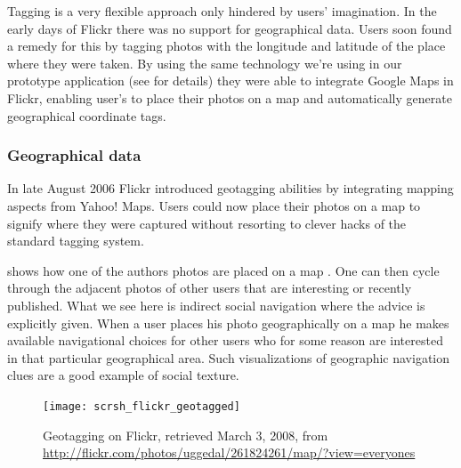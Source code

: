 Tagging is a very flexible approach only hindered by users' imagination. In
the early days of Flickr there was no support for geographical data. Users
soon found a remedy for this by tagging photos with the longitude and
latitude of the place where they were taken.
By using the same technology we're using in our prototype
application (see  for details)
they were able to integrate Google Maps%
 in Flickr, enabling user's to place their photos on a map and automatically
generate geographical coordinate tags.%

\subsubsection{Geographical data}

In late August 2006 Flickr introduced geotagging abilities
\citep{butterfield06a} by integrating mapping aspects from Yahoo! Maps.%
Users could now place their photos on a
map to signify where they were captured without resorting to clever hacks of
the standard tagging system.

 shows how one of the authors photos are
placed on a map .
One can then cycle through the adjacent photos of other users
that are interesting or recently published.
What we see here is indirect social navigation where the advice is explicitly
given. When a user places his photo geographically on a map he makes available
navigational choices for other users who for some reason are interested in
that particular geographical area. Such visualizations of geographic
navigation clues are a good example of social texture.

\begin{figure}
  \texttt{[image: scrsh\_flickr\_geotagged]}
  \caption[Flickr Geotagging]{%
     Geotagging on Flickr,
     retrieved March 3, 2008, from
     \url{http://flickr.com/photos/uggedal/261824261/map/?view=everyones}}
  \label{figure:scrsh.flickr.geotagged}
\end{figure}

